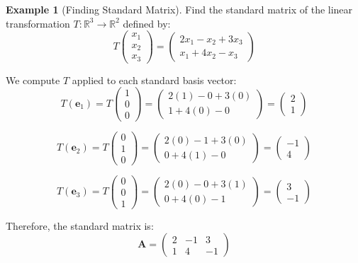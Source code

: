 \documentclass[12pt]{article}
\numberwithin{equation}{section}
\newcommand{\RR}{\mathbb{R}}
\newcommand{\vect}[1]{\boldsymbol{#1}}   %
\newcommand{\mat}[1]{\mathbf{#1}}        %
\theoremstyle{plain}
\theoremstyle{definition}
\newtheorem{example}[theorem]{Example}
\theoremstyle{remark}
\begin{document}
\begin{example}[Finding Standard Matrix]
Find the standard matrix of the linear transformation $T: \RR^3 \to \RR^2$ defined by:
$$T\begin{pmatrix} x_1 \\ x_2 \\ x_3 \end{pmatrix} = \begin{pmatrix} 2x_1 - x_2 + 3x_3 \\ x_1 + 4x_2 - x_3 \end{pmatrix}$$

We compute $T$ applied to each standard basis vector:
$$T(\vect{e}_1) = T\begin{pmatrix} 1 \\ 0 \\ 0 \end{pmatrix} = \begin{pmatrix} 2(1) - 0 + 3(0) \\ 1 + 4(0) - 0 \end{pmatrix} = \begin{pmatrix} 2 \\ 1 \end{pmatrix}$$

$$T(\vect{e}_2) = T\begin{pmatrix} 0 \\ 1 \\ 0 \end{pmatrix} = \begin{pmatrix} 2(0) - 1 + 3(0) \\ 0 + 4(1) - 0 \end{pmatrix} = \begin{pmatrix} -1 \\ 4 \end{pmatrix}$$

$$T(\vect{e}_3) = T\begin{pmatrix} 0 \\ 0 \\ 1 \end{pmatrix} = \begin{pmatrix} 2(0) - 0 + 3(1) \\ 0 + 4(0) - 1 \end{pmatrix} = \begin{pmatrix} 3 \\ -1 \end{pmatrix}$$

Therefore, the standard matrix is:
$$\mat{A} = \begin{pmatrix} 2 & -1 & 3 \\ 1 & 4 & -1 \end{pmatrix}$$
\end{example}
\end{document}
